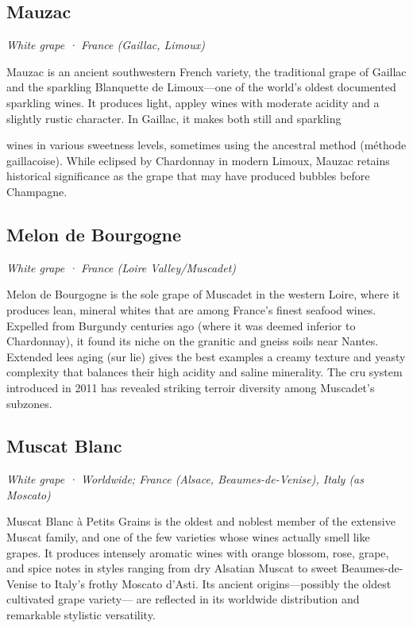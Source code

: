 \subsection*{Mauzac}
\textit{White grape · France (Gaillac, Limoux)}\par\smallskip

Mauzac is an ancient southwestern French variety, the traditional grape of Gaillac and the sparkling Blanquette de Limoux—one of the world’s oldest documented sparkling wines. It produces light, appley wines with moderate acidity and a slightly rustic character. In Gaillac, it makes both still and sparkling

wines in various sweetness levels, sometimes using the ancestral method (méthode gaillacoise). While eclipsed by Chardonnay in modern Limoux, Mauzac retains historical significance as the grape that may have produced bubbles before Champagne.

\subsection*{Melon de Bourgogne}
\textit{White grape · France (Loire Valley/Muscadet)}\par\smallskip

Melon de Bourgogne is the sole grape of Muscadet in the western Loire, where it produces lean, mineral whites that are among France’s finest seafood wines. Expelled from Burgundy centuries ago (where it was deemed inferior to Chardonnay), it found its niche on the granitic and gneiss soils near Nantes. Extended lees aging (sur lie) gives the best examples a creamy texture and yeasty complexity that balances their high acidity and saline minerality. The cru system introduced in 2011 has revealed striking terroir diversity among Muscadet’s subzones.

\subsection*{Muscat Blanc}
\textit{White grape · Worldwide; France (Alsace, Beaumes-de-Venise), Italy (as Moscato)}\par\smallskip

Muscat Blanc à Petits Grains is the oldest and noblest member of the extensive Muscat family, and one of the few varieties whose wines actually smell like grapes. It produces intensely aromatic wines with orange blossom, rose, grape, and spice notes in styles ranging from dry Alsatian Muscat to sweet Beaumes-de- Venise to Italy’s frothy Moscato d’Asti. Its ancient origins—possibly the oldest cultivated grape variety— are reflected in its worldwide distribution and remarkable stylistic versatility.

